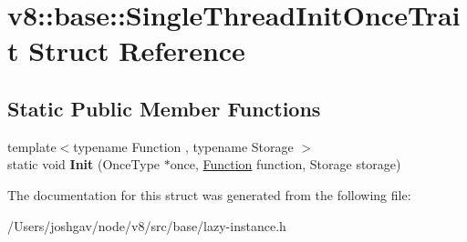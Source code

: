 \hypertarget{structv8_1_1base_1_1_single_thread_init_once_trait}{}\section{v8\+:\+:base\+:\+:Single\+Thread\+Init\+Once\+Trait Struct Reference}
\label{structv8_1_1base_1_1_single_thread_init_once_trait}
\subsection*{Static Public Member Functions}
\begin{DoxyCompactItemize}
\item 
{\footnotesize template$<$typename Function , typename Storage $>$ }\\static void {\bfseries Init} (Once\+Type $\ast$once, \hyperlink{classv8_1_1_function}{Function} function, Storage storage)\hypertarget{structv8_1_1base_1_1_single_thread_init_once_trait_a44e53a3c057ce7a79b4dad0aa568a9fa}{}\label{structv8_1_1base_1_1_single_thread_init_once_trait_a44e53a3c057ce7a79b4dad0aa568a9fa}

\end{DoxyCompactItemize}


The documentation for this struct was generated from the following file\+:\begin{DoxyCompactItemize}
\item 
/\+Users/joshgav/node/v8/src/base/lazy-\/instance.\+h\end{DoxyCompactItemize}
